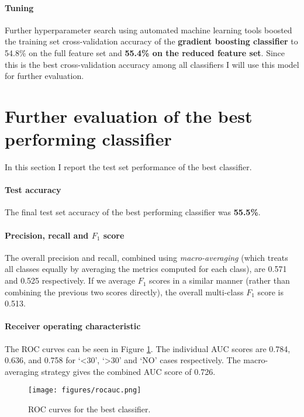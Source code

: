 \documentclass[10pt, twocolumn]{article}
\begin{document}
\paragraph{Tuning}
Further hyperparameter search using automated machine learning tools \cite{OlsonGECCO2016} boosted the training set cross-validation accuracy of the \textbf{gradient boosting classifier} to 54.8\% on the full feature set and \textbf{55.4\% on the reduced feature set}. Since this is the best cross-validation accuracy among all classifiers I will use this model for further evaluation.


\section{Further evaluation of the best performing classifier}
In this section I report the test set performance of the best classifier.

\paragraph{Test accuracy} The final test set accuracy of the best performing classifier was \textbf{55.5\%}. 

\paragraph{Precision, recall and $F_1$ score} The overall precision and recall, combined using \textit{macro-averaging} (which treats all classes equally by averaging the metrics computed for each class), are 0.571 and 0.525 respectively. If we average $F_1$ scores in a similar manner (rather than combining the previous two scores directly), the overall multi-class $F_1$ score is 0.513.

\paragraph{Receiver operating characteristic} The ROC curves can be seen in Figure \ref{rocauc}. The individual AUC scores are 0.784, 0.636, and 0.758 for ‘<30’, `>30' and `NO' cases respectively. The macro-averaging strategy gives the combined AUC score of 0.726.

\begin{figure}[htb!]
	\centering
	\texttt{[image: figures/rocauc.png]}
	\caption{ROC curves for the best classifier.}\label{rocauc}
\end{figure}
\end{document}
